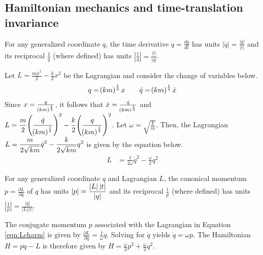 \subsection{Hamiltonian mechanics and time-translation invariance}

For any generalized coordinate $q$, the time derivative $\dot{q} = \frac{dq}{dt}$ has units $\left|\dot{q}\right| = \frac{\left|q\right|}{\left|t\right|}$ and its reciprocal $\frac{1}{\dot{q}}$ (where defined) has units $\left|\frac{1}{\dot{q}}\right| = \frac{\left|t\right|}{\left|q\right|}$.

\begin{answer}
	Let $L = \frac{m \dot{x}^2}{2} - \frac{k}{2} x^2$ be the Lagrangian and consider the change of variables below.
	\begin{align}\label{eqn:qharm}
		q = \!\left(k m\right)^{\frac{1}{4}} x
		\qquad
		\dot{q} = \!\left(k m\right)^{\frac{1}{4}} \dot{x}
	\end{align}
	Since $x = \frac{q}{\!\left(k m\right)^{\frac{1}{4}}}$, it follows that $\dot{x} = \frac{\dot{q}}{\!\left(k m\right)^{\frac{1}{4}}}$ and $\displaystyle L = \frac{m}{2} \!\left(\frac{\dot{q}}{\!\left(k m\right)^{\frac{1}{4}}}\right)^2 - \frac{k}{2} \!\left(\frac{q}{\!\left(k m\right)^{\frac{1}{4}}}\right)^2$.
	Let $\omega = \sqrt{\frac{k}{m}}$.
	Then, the Lagrangian $\displaystyle L = \frac{m}{2 \sqrt{k m}} \dot{q}^2 - \frac{k}{2 \sqrt{k m}} q^2$ is given by the equation below.
	\begin{align}\label{eqn:Lcharm}
		L & = \frac{1}{2 \omega} \dot{q}^2 - \frac{\omega}{2} q^2
	\end{align}
\end{answer}

For any generalized coordinate $q$ and Lagrangian $L$, the canonical momentum $p = \frac{\partial L}{\partial \dot{q}}$ of $q$ has units $\displaystyle \left|p\right| = \frac{\left|L\right| \left|t\right|}{\left|q\right|}$ and its reciprocal $\frac{1}{p}$ (where defined) has units $\left|\frac{1}{p}\right| = \frac{\left|q\right|}{\left|L\right| \left|t\right|}$.

\begin{answer}
	The conjugate momentum $p$ associated with the Lagrangian in Equation \eqref{eqn:Lcharm} is given by $\frac{\partial L}{\partial \dot{q}} = \frac{1}{\omega} \dot{q}$.
	Solving for $\dot{q}$ yields $\dot{q} = \omega p$.
	The Hamiltonian $H = p \dot{q} - L$ is therefore given by $H = \frac{\omega}{2} p^2 + \frac{\omega}{2} q^2$.
\end{answer}

